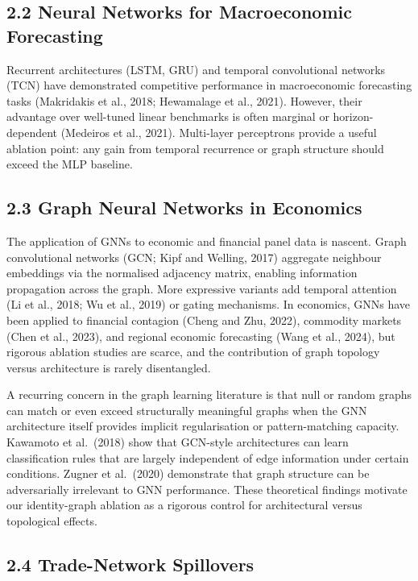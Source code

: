 \documentclass[
]{article}
\begin{document}
\subsection{2.2 Neural Networks for Macroeconomic
Forecasting}\label{neural-networks-for-macroeconomic-forecasting}

Recurrent architectures (LSTM, GRU) and temporal convolutional networks
(TCN) have demonstrated competitive performance in macroeconomic
forecasting tasks (Makridakis et al., 2018; Hewamalage et al., 2021).
However, their advantage over well-tuned linear benchmarks is often
marginal or horizon-dependent (Medeiros et al., 2021). Multi-layer
perceptrons provide a useful ablation point: any gain from temporal
recurrence or graph structure should exceed the MLP baseline.

\subsection{2.3 Graph Neural Networks in
Economics}\label{graph-neural-networks-in-economics}

The application of GNNs to economic and financial panel data is nascent.
Graph convolutional networks (GCN; Kipf and Welling, 2017) aggregate
neighbour embeddings via the normalised adjacency matrix, enabling
information propagation across the graph. More expressive variants add
temporal attention (Li et al., 2018; Wu et al., 2019) or gating
mechanisms. In economics, GNNs have been applied to financial contagion
(Cheng and Zhu, 2022), commodity markets (Chen et al., 2023), and
regional economic forecasting (Wang et al., 2024), but rigorous ablation
studies are scarce, and the contribution of graph topology versus
architecture is rarely disentangled.

A recurring concern in the graph learning literature is that null or
random graphs can match or even exceed structurally meaningful graphs
when the GNN architecture itself provides implicit regularisation or
pattern-matching capacity. Kawamoto et al.~(2018) show that GCN-style
architectures can learn classification rules that are largely
independent of edge information under certain conditions. Zugner et
al.~(2020) demonstrate that graph structure can be adversarially
irrelevant to GNN performance. These theoretical findings motivate our
identity-graph ablation as a rigorous control for architectural versus
topological effects.

\subsection{2.4 Trade-Network
Spillovers}\label{trade-network-spillovers}
\end{document}
